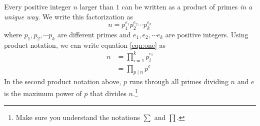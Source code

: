 \begin{theorem}
	Every positive integer $n$ larger than $1$ can be written as a product of primes \textit{in a unique way}. We write this factorization as
	\begin{equation}
		n=p_1^{e_1}p_2^{e_2}\cdots p_k^{e_k}\label{eqn:one}
	\end{equation}
	where $p_1,p_2,\cdots p_k$ are different primes and $e_1,e_2,\cdots e_k$ are positive integers. Using product notation, we can write equation \eqref{eqn:one} as
	\begin{align*}
		n
			&=\prod\limits_{i=1}^{k}p_i^{e_i}\\
			& =\prod\limits_{p\mid n}p^e
	\end{align*}
	In the second product notation above, $p$ runs through all primes dividing $n$ and $e$ is the maximum power of $p$ that divides $n$.\footnote{Make sure you understand the notations $\sum$ and $\prod$.}
\end{theorem}

